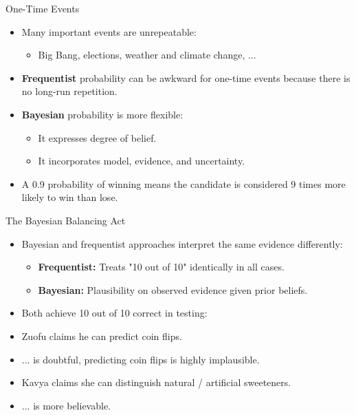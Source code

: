 \documentclass[12pt]{beamer}
\newcommand{\vocab}[1]{\textcolor{AggieMaroon}{\textbf{#1}}}
\begin{document}
\begin{frame}{}
\begin{block}{One-Time Events}
\begin{itemize}
\item Many important events are unrepeatable:

\begin{itemize}
\item[] Big Bang, elections, weather and climate change, ...
\end{itemize}

\item \vocab{Frequentist} probability can be awkward for one-time events because there is no long-run repetition.
\item \vocab{Bayesian} probability is more flexible:

\begin{itemize}
\item It expresses degree of belief.
\item It incorporates model, evidence, and uncertainty.
\end{itemize}
\end{itemize}
\end{block}

\begin{itemize}
\item A 0.9 probability of winning means the candidate is considered 9 times more likely to win than lose.
\end{itemize}

\end{frame}

\begin{frame}{}
\begin{block}{The Bayesian Balancing Act}
\begin{itemize}
\item Bayesian and frequentist approaches interpret the same evidence differently:
\begin{itemize}
\item \vocab{Frequentist:} Treats "10 out of 10" identically in all cases.
\item \vocab{Bayesian:} Plausibility on observed evidence given prior beliefs.
\end{itemize}
\end{itemize}
\end{block}

\begin{itemize}
\item[] Both achieve 10 out of 10 correct in testing:
\item Zuofu claims he can predict coin flips.
\item[] ... is doubtful, predicting coin flips is highly implausible.
\item Kavya claims she can distinguish natural / artificial sweeteners.
\item[] ... is more believable.
\end{itemize}

\end{frame}
\end{document}
